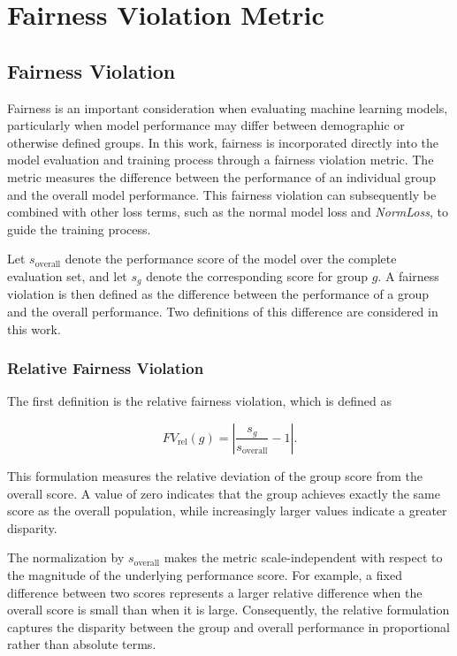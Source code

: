 \chapter{Fairness Violation Metric}
\label{chap}

\section{Fairness Violation}

Fairness is an important consideration when evaluating machine learning models, particularly when model performance may differ between demographic or otherwise defined groups. In this work, fairness is incorporated directly into the model evaluation and training process through a fairness violation metric. The metric measures the difference between the performance of an individual group and the overall model performance. This fairness violation can subsequently be combined with other loss terms, such as the normal model loss and \textit{NormLoss}, to guide the training process.

Let $s_{\mathrm{overall}}$ denote the performance score of the model over the complete evaluation set, and let $s_g$ denote the corresponding score for group $g$. A fairness violation is then defined as the difference between the performance of a group and the overall performance. Two definitions of this difference are considered in this work.

\subsection{Relative Fairness Violation}

The first definition is the relative fairness violation, which is defined as

\begin{equation}
FV_{\mathrm{rel}}(g)
=
\left|
\frac{s_g}{s_{\mathrm{overall}}} - 1
\right|.
\label{eq}
\end{equation}

This formulation measures the relative deviation of the group score from the overall score. A value of zero indicates that the group achieves exactly the same score as the overall population, while increasingly larger values indicate a greater disparity.

The normalization by $s_{\mathrm{overall}}$ makes the metric scale-independent with respect to the magnitude of the underlying performance score. For example, a fixed difference between two scores represents a larger relative difference when the overall score is small than when it is large. Consequently, the relative formulation captures the disparity between the group and overall performance in proportional rather than absolute terms.

